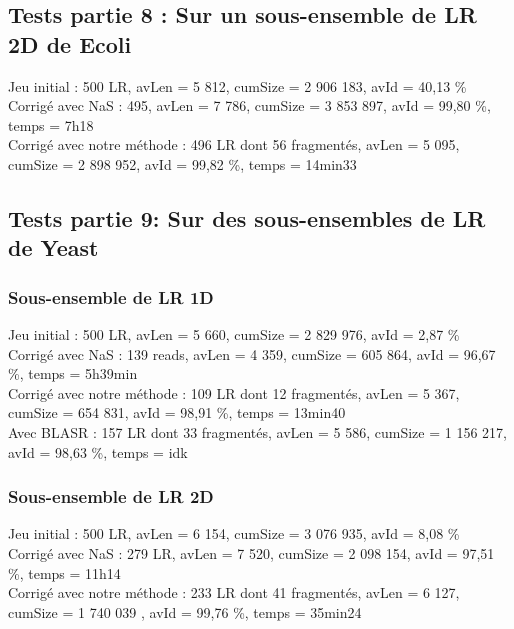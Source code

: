 \documentclass[12pt]{article}
\begin{document}
\subsection{Tests partie 8 : Sur un sous-ensemble de LR 2D de Ecoli}

Jeu initial : 500 LR, avLen = 5 812, cumSize = 2 906 183, avId = 40,13 \% \\

Corrigé avec NaS : 495, avLen = 7 786, cumSize = 3 853 897, avId = 99,80 \%, temps = 7h18 \\

Corrigé avec notre méthode : 496 LR dont 56 fragmentés, avLen = 5 095, cumSize = 2 898 952, avId = 99,82 \%, temps = 14min33 \\

\subsection{Tests partie 9: Sur des sous-ensembles de LR de Yeast}

\subsubsection{Sous-ensemble de LR 1D}

Jeu initial : 500 LR, avLen = 5 660, cumSize =  2 829 976, avId = 2,87 \%\\

Corrigé avec NaS : 139 reads, avLen = 4 359, cumSize = 605 864, avId = 96,67 \%, temps = 5h39min \\

Corrigé avec notre méthode : 109 LR dont 12 fragmentés, avLen = 5 367, cumSize = 654 831, avId = 98,91 \%, temps = 13min40 \\

Avec BLASR : 157 LR dont 33 fragmentés, avLen = 5 586, cumSize = 1 156 217, avId = 98,63 \%, temps = idk

\subsubsection{Sous-ensemble de LR 2D}

Jeu initial : 500 LR, avLen = 6 154, cumSize = 3 076 935, avId = 8,08 \% \\

Corrigé avec NaS : 279 LR, avLen = 7 520, cumSize = 2 098 154, avId = 97,51 \%, temps = 11h14 \\

Corrigé avec notre méthode : 233 LR dont 41 fragmentés, avLen = 6 127, cumSize = 1 740 039 , avId = 99,76 \%, temps = 35min24 \\
\end{document}
